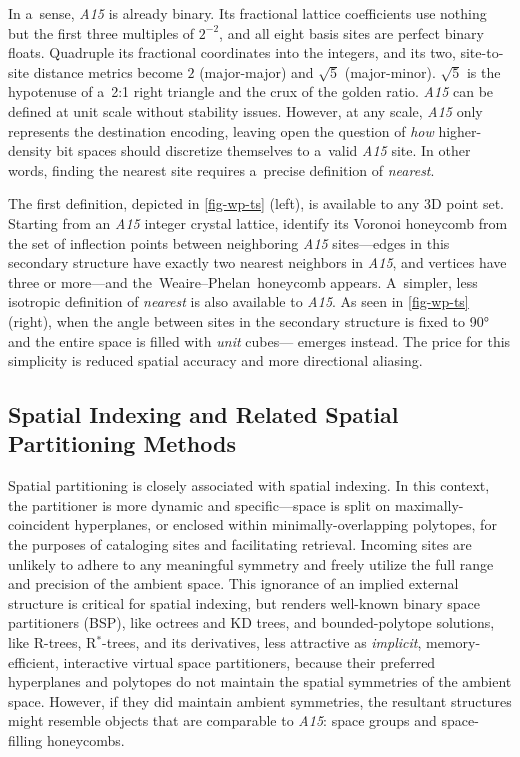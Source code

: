 \documentclass[10pt]{article}
\def\AAAB{\textit{A15}}
\def\tWPh{the~Weaire--Phelan~honeycomb}
\begin{document}
In a~sense, \AAAB{} is already binary. Its fractional lattice coefficients use nothing but the first three multiples of $2^{-2}$,
and all eight basis sites are perfect binary floats. Quadruple its fractional coordinates into the integers, and its two,
site-to-site distance metrics become $2$ (major-major) and $\sqrt{5}$ (major-minor). $\sqrt{5}$ is the hypotenuse of a~2:1 right
triangle and the crux of the golden ratio. \AAAB{} can be defined at unit scale without stability issues. However, at any scale,
\AAAB{} only represents the destination encoding, leaving open the question of \emph{how} higher-density bit spaces should
discretize themselves to a~valid \AAAB{} site. In other words, finding the nearest site requires a~precise definition of
\emph{nearest}.

The first definition, depicted in \autoref{fig-wp-ts} (left), is available to any 3D point set. Starting from an \AAAB{} integer
crystal lattice, identify its Voronoi honeycomb from the set of inflection points between neighboring \AAAB{} sites---edges in
this secondary structure have exactly two nearest neighbors in \AAAB{}, and vertices have three or more---and \tWPh{} appears.
A~simpler, less isotropic definition of \emph{nearest} is also available to \AAAB{}. As seen in \autoref{fig-wp-ts} (right), when
the angle between sites in the secondary structure is fixed to 90° and the entire space is filled with
\emph{unit} cubes---\tTSp{} emerges instead. The price for this simplicity is reduced spatial accuracy and more directional
aliasing.

\subsection{Spatial Indexing and Related Spatial Partitioning Methods}\label{spatial-indexing-and-related-spatial-partitioning-methods}

Spatial partitioning is closely associated with spatial indexing. In this context, the partitioner is more dynamic and
specific---space is split on maximally-coincident hyperplanes, or enclosed within minimally-overlapping polytopes, for the
purposes of cataloging sites and facilitating retrieval. Incoming sites are unlikely to adhere to any meaningful symmetry and
freely utilize the full range and precision of the ambient space. This ignorance of an implied external structure is critical for
spatial indexing, but renders well-known binary space partitioners (BSP), like octrees and KD trees, and bounded-polytope
solutions, like R-trees, R$^*$-trees, and its derivatives, less attractive as \emph{implicit}, memory-efficient, interactive
virtual space partitioners, because their preferred hyperplanes and polytopes do not maintain the spatial symmetries of the
ambient space. However, if they did maintain ambient symmetries, the resultant structures might resemble objects that are
comparable to \AAAB{}: space groups and space-filling honeycombs.
\end{document}
